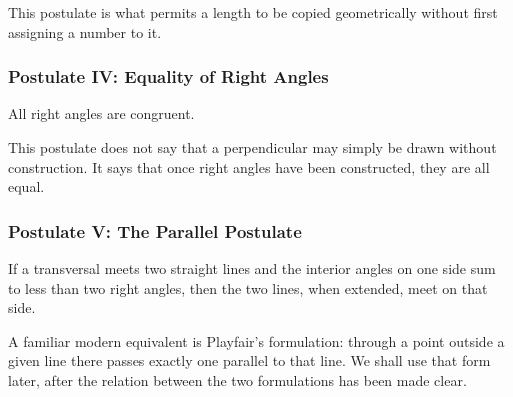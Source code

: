 This postulate is what permits a length to be copied geometrically without
first assigning a number to it.

\subsubsection{Postulate IV: Equality of Right Angles}

All right angles are congruent.

\begin{center}
\end{center}

This postulate does not say that a perpendicular may simply be drawn without
construction. It says that once right angles have been constructed, they are
all equal.

\subsubsection{Postulate V: The Parallel Postulate}

If a transversal meets two straight lines and the interior angles on one side
sum to less than two right angles, then the two lines, when extended, meet on
that side.

\begin{center}
\end{center}

A familiar modern equivalent is Playfair's formulation: through a point outside
a given line there passes exactly one parallel to that line. We shall use that
form later, after the relation between the two formulations has been made clear.

